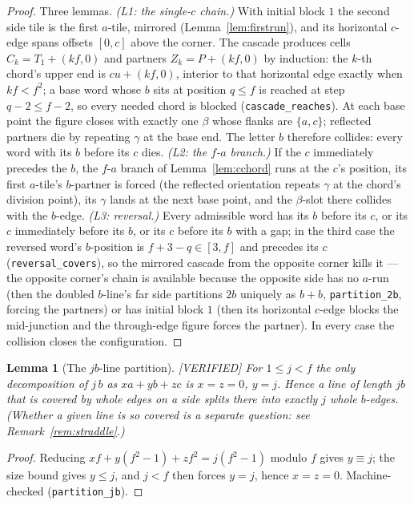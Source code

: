 \documentclass[11pt,reqno]{amsart}
\theoremstyle{plain}
\newtheorem{lemma}[theorem]{Lemma}
\theoremstyle{definition}
\newcommand{\lab}[1]{\hfill\textnormal{\footnotesize\textsc{[#1]}}}
\begin{document}
\begin{proof}
Three lemmas. \emph{(L1: the single-$c$ chain.)} With initial block $1$ the second side tile is the
first $a$-tile, mirrored (Lemma~\ref{lem:firstrun}), and its horizontal $c$-edge spans offsets
$[0,c]$ above the corner. The cascade produces cells $C_k=T_1+(kf,0)$ and partners
$Z_k=P+(kf,0)$ by induction: the $k$-th chord's upper end is $cu+(kf,0)$, interior to that
horizontal edge exactly when $kf<f^2$; a base word whose $b$ sits at position $q\le f$ is reached at
step $q-2\le f-2$, so every needed chord is blocked (\texttt{cascade\_reaches}). At each base point
the figure closes with exactly one $\beta$ whose flanks are $\{a,c\}$; reflected partners die by
repeating $\gamma$ at the base end. The letter $b$ therefore collides: every word with its $b$
before its $c$ dies. \emph{(L2: the $f$-$a$ branch.)} If the $c$ immediately precedes the $b$, the
$f$-$a$ branch of Lemma~\ref{lem:cchord} runs at the $c$'s position, its first $a$-tile's
$b$-partner is forced (the reflected orientation repeats $\gamma$ at the chord's division point),
its $\gamma$ lands at the next base point, and the $\beta$-slot there collides with the $b$-edge.
\emph{(L3: reversal.)} Every admissible word has its $b$ before its $c$, or its $c$ immediately
before its $b$, or its $c$ before its $b$ with a gap; in the third case the reversed word's
$b$-position is $f+3-q\in[3,f]$ and precedes its $c$ (\texttt{reversal\_covers}), so the mirrored
cascade from the opposite corner kills it — the opposite corner's chain is available because the
opposite side has no $a$-run (then the doubled $b$-line's far side partitions $2b$ uniquely as
$b+b$, \texttt{partition\_2b}, forcing the partners) or has initial block $1$ (then its horizontal
$c$-edge blocks the mid-junction and the through-edge figure forces the partner). In every case the
collision closes the configuration.
\end{proof}

\begin{lemma}[The $jb$-line partition]\label{lem:jbline}\lab{VERIFIED}
For $1\le j<f$ the only decomposition of $j\,b$ as $xa+yb+zc$ is $x=z=0$, $y=j$. Hence a line
of length $jb$ that is covered by whole edges on a side splits there into exactly $j$ whole
$b$-edges. (Whether a given line is so covered is a separate question: see
Remark~\ref{rem:straddle}.)
\end{lemma}
\begin{proof}
Reducing $xf+y(f^2-1)+zf^2=j(f^2-1)$ modulo $f$ gives $y\equiv j$; the size bound gives $y\le j$,
and $j<f$ then forces $y=j$, hence $x=z=0$. Machine-checked (\texttt{partition\_jb}).
\end{proof}
\end{document}
